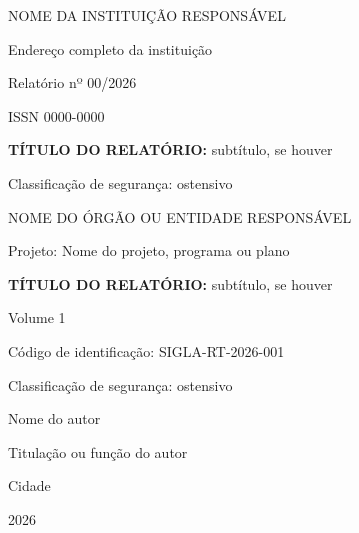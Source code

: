 \documentclass[12pt,a4paper,oneside]{article}
\begin{document}
\begin{titlepage}\centering{}
  NOME DA INSTITUIÇÃO RESPONSÁVEL\par
  Endereço completo da instituição\par
  \vspace{2\baselineskip}
  Relatório nº 00/2026\par
  ISSN 0000-0000\par
  \vfill
  {\bfseries TÍTULO DO RELATÓRIO:} subtítulo, se houver\par
  \vfill
  Classificação de segurança: ostensivo\par
\end{titlepage}
\setcounter{page}{1}

\begingroup\thispagestyle{empty}\centering
  NOME DO ÓRGÃO OU ENTIDADE RESPONSÁVEL\par
  \vspace{2\baselineskip}
  Projeto: Nome do projeto, programa ou plano\par
  \vfill
  {\bfseries TÍTULO DO RELATÓRIO:} subtítulo, se houver\par
  \vspace{\baselineskip}
  Volume 1\par
  \vspace{\baselineskip}
  Código de identificação: SIGLA-RT-2026-001\par
  Classificação de segurança: ostensivo\par
  \vfill
  Nome do autor\par
  Titulação ou função do autor\par
  \vfill
  Cidade\par
  2026\par
\endgroup
\clearpage
\end{document}
